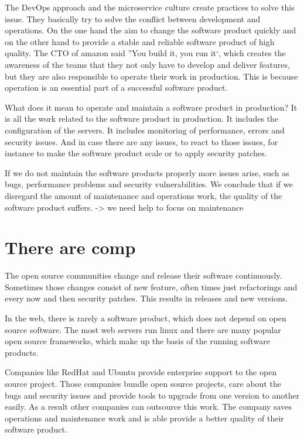 The DevOps approach and the microservice culture create practices to solve this
issue. They basically try to solve the conflict between development and operations. On the
one hand the aim to change the software product quickly and on the other hand to provide a
stable and reliable software product of high quality. The CTO of amazon said ''You build
it, you run it`, which creates the awareness of the teams that they not only have to
develop and deliver features, but they are also responsible to operate their work in
production. This is because operation is an essential part of a successful software
product.

What does it mean to operate and maintain a software product in production? It is all the
work related to the software product in production. It includes the configuration of the
servers. It includes monitoring of performance, errors and security issues. And in case
there are any issues, to react to those issues, for instance to make the software product
scale or to apply security patches.

If we do not maintain the software products properly more issues arise, such as bugs,
performance problems and security vulnerabilities. We conclude that if we disregard the
amount of maintenance and operations work, the quality of the software product suffers.
-> we need help to focus on maintenance

\section{There are comp}

The open source communities change and release their software continuously. Sometimes
those changes consist of new feature, often times just refactorings and every now and then
security patches. This results in releases and new versions.

In the web, there is rarely a software product, which does not depend on open source
software. The most web servers run linux and there are many popular open source
frameworks, which make up the basis of the running software products.

Companies like RedHat and Ubuntu provide enterprise support to the open source
project. Those companies bundle open source projects, care about the bugs and security
issues and provide tools to upgrade from one version to another easily. As a result other
companies can outsource this work. The company saves operations and maintenance work and
is able provide a better quality of their software product.

